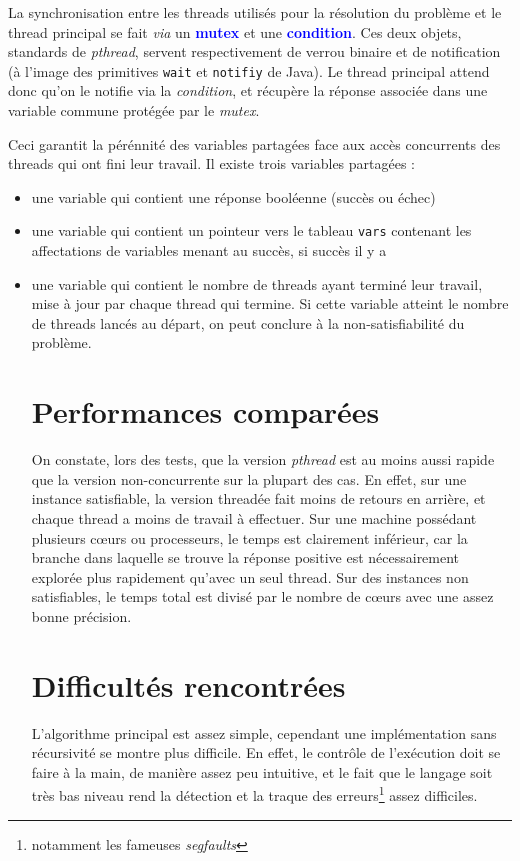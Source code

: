 \documentclass{article}
\newcommand{\keyword}[1]{\textbf{\textcolor{blue}{#1}}}
\newcommand{\code}[1]{\texttt{{#1}}}
\begin{document}
    La synchronisation entre les threads utilisés pour la résolution du problème et le thread principal se fait \emph{via} un \keyword{mutex} et une \keyword{condition}. Ces deux objets, standards de \emph{pthread}, servent respectivement de verrou binaire et de notification (à l'image des primitives \code{wait} et \code{notifiy} de Java). Le thread principal attend donc qu'on le notifie via la \emph{condition}, et récupère la réponse associée dans une variable commune protégée par le \emph{mutex}. 

    Ceci garantit la pérénnité des variables partagées face aux accès concurrents des threads qui ont fini leur travail. Il existe trois variables partagées :
    \begin{itemize}
      \item une variable qui contient une réponse booléenne (succès ou échec)
      \item une variable qui contient un pointeur vers le tableau \code{vars} contenant les affectations de variables menant au succès, si succès il y a
      \item une variable qui contient le nombre de threads ayant terminé leur travail, mise à jour par chaque thread qui termine. Si cette variable atteint le nombre de threads lancés au départ, on peut conclure à la non-satisfiabilité du problème.





\section{Performances comparées}


    On constate, lors des tests, que la version \emph{pthread} est au moins aussi rapide que la version non-concurrente sur la plupart des cas. En effet, sur une instance satisfiable, la version threadée fait moins de retours en arrière, et chaque thread a moins de travail à effectuer. Sur une machine possédant plusieurs cœurs ou processeurs, le temps est clairement inférieur, car la branche dans laquelle se trouve la réponse positive est nécessairement explorée plus rapidement qu'avec un seul thread. Sur des instances non satisfiables, le temps total est divisé par le nombre de cœurs avec une assez bonne précision.

\section{Difficultés rencontrées}
    L'algorithme principal est assez simple, cependant une implémentation sans récursivité se montre plus difficile. En effet, le contrôle de l'exécution doit se faire à la main, de manière assez peu intuitive, et le fait que le langage soit très bas niveau rend la détection et la traque des erreurs\footnote{notamment les fameuses \emph{segfaults}} assez difficiles.


\end{itemize}
\end{document}
